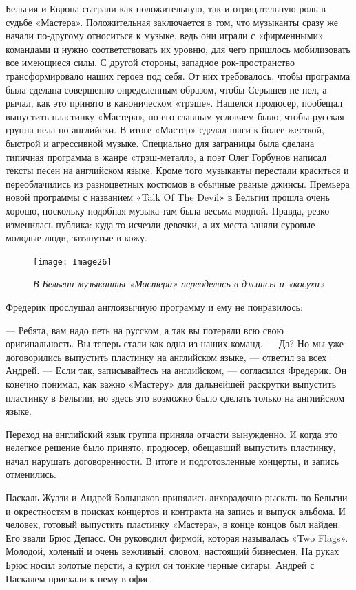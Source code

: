 \documentclass[16pt,a5paper,oneside]{book}
\begin{document}
Бельгия и Европа сыграли как положительную, так и отрицательную роль в судьбе «Мастера». Положительная заключается в
том, что музыканты сразу же начали по-другому относиться к музыке, ведь они играли с «фирменными» командами и нужно
соответствовать их уровню, для чего пришлось мобилизовать все имеющиеся силы. С другой стороны, западное
рок-пространство трансформировало наших героев под себя. От них требовалось, чтобы программа была сделана совершенно
определенным образом, чтобы Серышев не пел, а рычал, как это принято в каноническом «трэше». Нашелся продюсер, пообещал
выпустить пластинку «Мастера», но его главным условием было, чтобы русская группа пела по-английски. В итоге «Мастер»
сделал шаги к более жесткой, быстрой и агрессивной музыке. Специально для заграницы была сделана типичная программа в
жанре «трэш-металл», а поэт Олег Горбунов написал тексты песен на английском языке. Кроме того музыканты перестали
краситься и переоблачились из разноцветных костюмов в обычные рваные джинсы. Премьера новой программы с названием «Talk
Of The Devil» в Бельгии прошла очень хорошо, поскольку подобная музыка там была весьма модной. Правда, резко изменилась
публика: куда-то исчезли девочки, а их места заняли суровые молодые люди, затянутые в кожу.

\begin{figure}
    \centering
    \texttt{[image: Image26]}
    \caption{\textit{В Бельгии музыканты «Мастера» переоделись в джинсы и «косухи»}}
\end{figure}

Фредерик прослушал англоязычную программу и ему не понравилось:

— Ребята, вам надо петь на русском, а так вы потеряли всю свою оригинальность. Вы теперь стали как одна из наших команд.
— Да? Но мы уже договорились выпустить пластинку на английском языке, — ответил за всех Андрей.
— Если так, записывайтесь на английском, — согласился Фредерик. Он конечно понимал, как важно «Мастеру» для дальнейшей
раскрутки выпустить пластинку в Бельгии, но здесь это возможно было сделать только на английском языке.

Переход на английский язык группа приняла отчасти вынужденно. И когда это нелегкое решение было принято, продюсер,
обещавший выпустить пластинку, начал нарушать договоренности. В итоге и подготовленные концерты, и запись отменились.

Паскаль Жуази и Андрей Большаков принялись лихорадочно рыскать по Бельгии и окрестностям в поисках концертов и контракта
на запись и выпуск альбома. И человек, готовый выпустить пластинку «Мастера», в конце концов был найден. Его звали Брюс
Депасс. Он руководил фирмой, которая называлась «Two Flags». Молодой, холеный и очень вежливый, словом, настоящий
бизнесмен. На руках Брюс носил золотые персти, а курил он тонкие черные сигары. Андрей с Паскалем приехали к нему в
офис.
\end{document}
